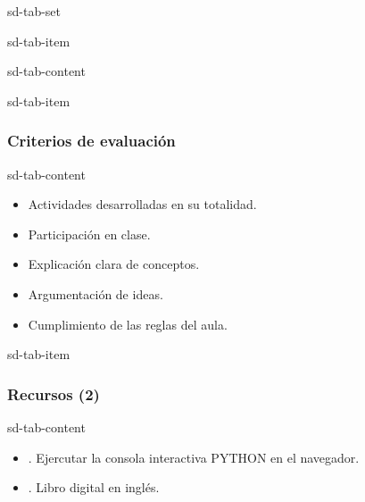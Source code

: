 \documentclass[letterpaper,10pt,spanish]{sphinxmanual}
\begin{document}
\begin{sphinxuseclass}{sd-tab-set}
\begin{sphinxuseclass}{sd-tab-item}
\begin{sphinxuseclass}{sd-tab-content}
\begin{itemize}
\end{itemize}

\end{sphinxuseclass}
\end{sphinxuseclass}
\begin{sphinxuseclass}{sd-tab-item}\subsubsection*{Criterios de evaluación}

\begin{sphinxuseclass}{sd-tab-content}\begin{itemize}
\item {} 
\sphinxAtStartPar
Actividades desarrolladas en su totalidad.

\item {} 
\sphinxAtStartPar
Participación en clase.

\item {} 
\sphinxAtStartPar
Explicación clara de conceptos.

\item {} 
\sphinxAtStartPar
Argumentación de ideas.

\item {} 
\sphinxAtStartPar
Cumplimiento de las reglas del aula.

\end{itemize}

\end{sphinxuseclass}
\end{sphinxuseclass}
\begin{sphinxuseclass}{sd-tab-item}\subsubsection*{Recursos (2)}

\begin{sphinxuseclass}{sd-tab-content}\begin{itemize}
\item {} 
\sphinxAtStartPar
{}. Ejercutar la consola interactiva PYTHON en el navegador.

\item {} 
\sphinxAtStartPar
{}. Libro digital en inglés.

\end{itemize}

\end{sphinxuseclass}
\end{sphinxuseclass}
\end{sphinxuseclass}
\end{document}
